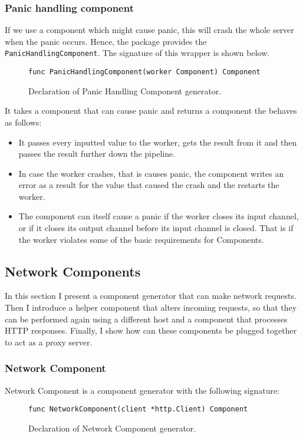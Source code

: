 \documentclass[12pt,a4paper]{article}
\begin{document}
\subsubsection{Panic handling component}
If we use a component which might cause panic, this will crash the whole
server when the panic occurs. Hence, the package provides the 
\texttt{PanicHandlingComponent}. The signature of this wrapper is shown 
below.
\begin{figure}[h]
\centering
\begin{lstlisting}
func PanicHandlingComponent(worker Component) Component
\end{lstlisting}
\caption[scale=1.0]{Declaration of Panic Handling Component generator.}
\label{fig:panicHandler}
\end{figure}

It takes a component that can cause panic and returns a component the 
behaves as follows:
\begin{itemize}
	\item It passes every inputted value to the worker, gets the result 
          from it and then passes the result further down the pipeline.
	\item In case the worker crashes, that is causes panic, the component 
          writes an error as a result for the value that caused the crash 
          and the restarts the worker.
	\item The component can itself cause a panic if the worker closes its 
          input channel, or if it closes its output channel before its input 
          channel is closed. That is if the worker violates some of the basic 
          requirements for Components.
\end{itemize}

\subsection{Network Components}
In this section I present a component generator that can make network
requests. Then I introduce a helper component that alters incoming 
requests, so that they can be performed again using a different host
and a component that processes HTTP responses. Finally, I show how
can these components be plugged together to act as a proxy server. 

\subsubsection{Network Component}
Network Component is a component generator with the following signature:
\begin{figure}[h]
\centering
\begin{lstlisting}
func NetworkComponent(client *http.Client) Component
\end{lstlisting}
\caption[scale=1.0]{Declaration of Network Component generator.}
\label{fig:NetworkComponent}
\end{figure}
\end{document}
